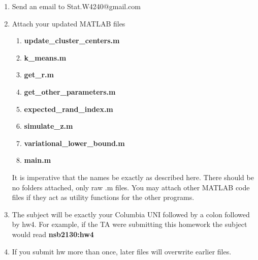 \documentclass[12pt]{article}
\begin{document}
\begin{enumerate}
	\item Send an email to Stat.W4240@gmail.com
	\item {Attach your updated MATLAB files 
		\begin{enumerate}
			\item {\bf update\_cluster\_centers.m} 
			\item	 {\bf k\_means.m}
			\item  {\bf get\_r.m}
			\item {\bf get\_other\_parameters.m}
			\item  {\bf expected\_rand\_index.m}
			\item {\bf simulate\_z.m}
			\item {\bf variational\_lower\_bound.m}
			\item  {\bf main.m}
		\end{enumerate} It is imperative that the names be exactly as described here. There should be no folders attached, only raw .m files.  You may attach other MATLAB code files if they act as utility functions for the other programs. }
	\item The subject will be exactly your Columbia UNI followed by a colon followed by hw4.  For example, if the TA were submitting this homework the subject would read {\bf nsb2130:hw4}
	\item If you submit hw more than once, later files will overwrite earlier files.
\end{enumerate}


\problemsdone
\end{document}
